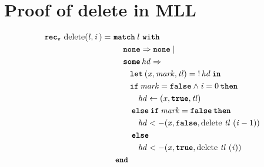\documentclass[thesis.tex]{subfiles}
\begin{document}
\section{Proof of delete in MLL}
\begin{align*}
  \RecV {delete}(\langv{l}, \langv{i}\,)=\  & \Match \langv{l}\, with                                                                           \\
                                            & \quad \None => \None |                                                                            \\
                                            & \quad \Some \langv{hd} =>                                                                         \\
                                            & \quad\quad \Let (\lvar, \langv{mark}, \langv{tl}) = \deref \langv{hd} in                          \\
                                            & \quad\quad \If \langv{mark} = \False \land \langv{i} = 0 then                                     \\
                                            & \quad\quad\quad \langv{hd} \gets (\lvar, \True, \langv{tl})                                       \\
                                            & \quad\quad \Else \If \langv{mark} = \False then                                                   \\
                                            & \quad\quad\quad \langv{hd} <- (\lvar, \False, \operatorname{delete}\,\langv{tl}\ (\langv{i} - 1)) \\
                                            & \quad\quad \Else                                                                                  \\
                                            & \quad\quad\quad \langv{hd} <- (\lvar, \True, \operatorname{delete}\,\langv{tl}\ (\langv{i}))      \\
                                            & end
\end{align*}
\label{sec:proofmll}
\end{document}
